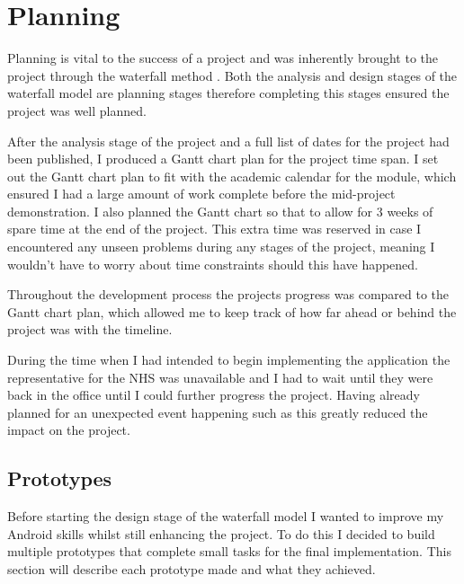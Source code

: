 \section{Planning}
Planning is vital to the success of a project and was inherently brought to the project through the waterfall method \cite{waterfall}. Both the analysis and design stages of the waterfall model are planning stages therefore completing this stages ensured the project was well planned.

After the analysis stage of the project and a full list of dates for the project had been published, I produced a Gantt chart plan for the project time span. I set out the Gantt chart plan to fit with the academic calendar for the module, which ensured I had a large amount of work complete before the mid-project demonstration. I also planned the Gantt chart so that to allow for 3 weeks of spare time at the end of the project. This extra time was reserved in case I encountered any unseen problems during any stages of the project, meaning I wouldn’t have to worry about time constraints should this have happened. 

Throughout the development process the projects progress was compared to the Gantt chart plan, which allowed me to keep track of how far ahead or behind the project was with the timeline.

During the time when I had intended to begin implementing the application the representative for the NHS was unavailable and I had to wait until they were back in the office until I could further progress the project. Having already planned for an unexpected event happening such as this greatly reduced the impact on the project. 

\subsection{Prototypes}

Before starting the design stage of the waterfall model \cite{waterfall} I wanted to improve my Android skills whilst still enhancing the project. To do this I decided to build multiple prototypes that complete small tasks for the final implementation. This section will describe each prototype made and what they achieved.

